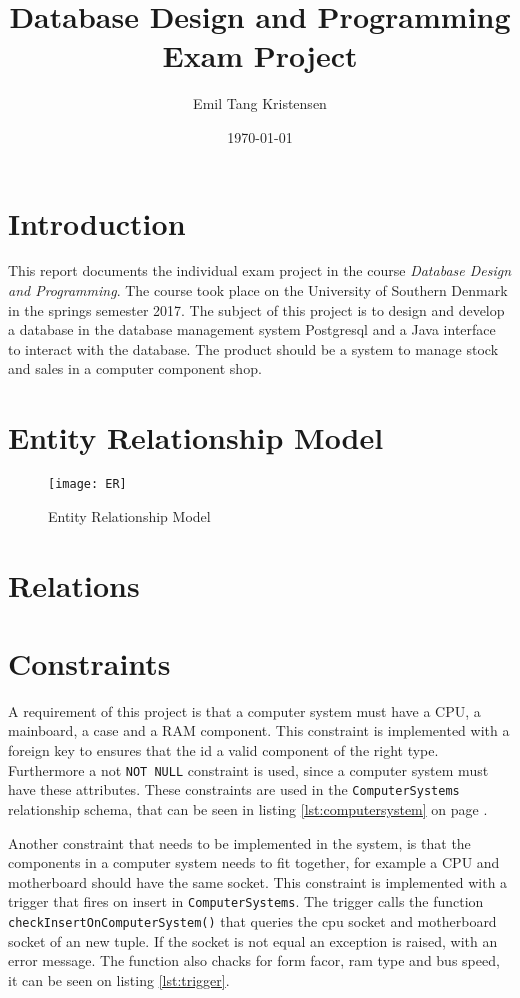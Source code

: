 \documentclass[12pt,a4paper]{article}
\title{\textbf{Database Design and Programming Exam Project}}
\author{Emil Tang Kristensen}
\date{\today}
\begin{document}
\maketitle
\tableofcontents

\section{Introduction}
This report documents the individual exam project in the course \emph{Database Design and Programming}. 
The course took place on the University of Southern Denmark in the springs semester 2017.
The subject of this project is to design and develop a database in the database management system Postgresql and a Java interface to interact with the database.  
The product should be a system to manage stock and sales in a computer component shop.

\section{Entity Relationship Model}


\begin{figure}[!htbp]
    \centering
    \texttt{[image: ER]}
    \caption{Entity Relationship Model}
    \label{fig:er}
\end{figure}

\section{Relations}

\section{Constraints}

A requirement of this project is that a computer system must have a CPU, a mainboard, a case and a RAM component. 
This constraint is implemented with a foreign key to ensures that the id a valid component of the right type.
Furthermore a not \texttt{NOT NULL} constraint is used, since a computer system must have these attributes. 
These constraints are used in the \texttt{ComputerSystems} relationship schema, that can be seen in listing \ref{lst:computersystem} on page \pageref{lst:computersystem}.

Another constraint that needs to be implemented in the system, is that the components in a computer system needs to fit together, for example a CPU and motherboard should have the same socket.
This constraint is implemented with a trigger that fires on insert in \texttt{ComputerSystems}. The trigger calls the function \texttt{checkInsertOnComputerSystem()} that queries the cpu socket and motherboard socket of an new tuple. If the socket is not equal an exception is raised, with an error message. The function also chacks for form facor, ram type and bus speed, it can be seen on listing \ref{lst:trigger}.
\end{document}
